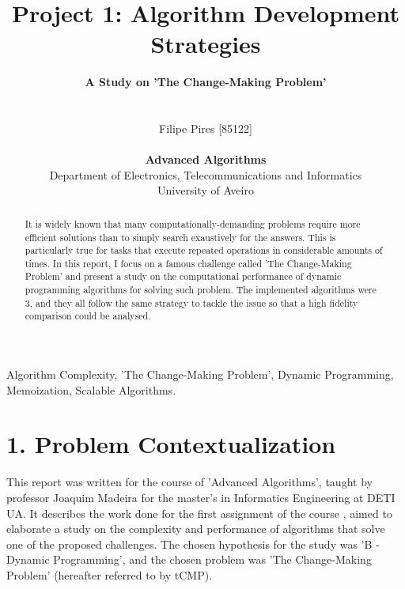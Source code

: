 \documentclass[shortpaper]{revdetua}
\begin{document}
 

\title{\LARGE{{\bf Project 1: Algorithm Development Strategies\/}}}

\author{
\Large{{\bf A Study on 'The Change-Making Problem'\/}}\\\\\\
Filipe Pires [85122]\\
\\
{\bf Advanced Algorithms\/}\\
\normalsize{Department of Electronics, Telecommunications and Informatics}\\
\normalsize{University of Aveiro}\\
} 

\maketitle

\begin{abstract}
It is widely known that many computationally-demanding problems require more 
efficient solutions than to simply search exaustively for the answers.
This is particularly true for tasks that execute repeated operations in 
considerable amounts of times.
In this report, I focus on a famous challenge called 'The Change-Making Problem' 
and present a study on the computational performance of dynamic programming 
algorithms for solving such problem.
The implemented algorithms were 3, and they all follow the same strategy to 
tackle the issue so that a high fidelity comparison could be analysed.
\end{abstract}

\begin{keywords}
Algorithm Complexity, 'The Change-Making Problem', Dynamic Programming, 
Memoization, Scalable Algorithms.
\end{keywords}

\section*{1. Problem Contextualization}

This report was written for the course of 'Advanced Algorithms', taught by 
professor Joaquim Madeira for the master's in Informatics Engineering at DETI UA.
It describes the work done for the first assignment of the course \cite{trab1},
aimed to elaborate a study on the complexity and performance of algorithms that
solve one of the proposed challenges.
The chosen hypothesis for the study was 'B - Dynamic Programming', and the chosen
problem was 'The Change-Making Problem' (hereafter referred to by tCMP).
\end{document}
